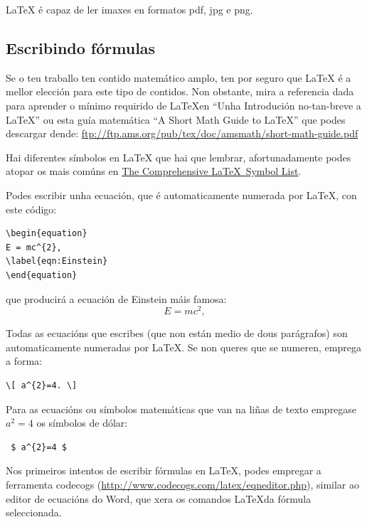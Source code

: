 \LaTeX{} é capaz de ler imaxes en formatos pdf, jpg e png.

\subsection{Escribindo fórmulas}

Se o teu traballo ten contido matemático amplo, ten por seguro que \LaTeX{} é a mellor elección para este tipo de contidos. Non obstante, mira a referencia dada para aprender o mínimo requirido de \LaTeX en \enquote{Unha Introdución no-tan-breve a \LaTeX} ou esta guía matemática \enquote{A Short Math Guide to \LaTeX} que podes descargar dende: \url{ftp://ftp.ams.org/pub/tex/doc/amsmath/short-math-guide.pdf}


Hai diferentes símbolos en \LaTeX{} que hai que lembrar, afortunadamente podes atopar os mais comúns en \href{http://ctan.org/pkg/comprehensive}{The Comprehensive \LaTeX~Symbol List}.

Podes escribir unha ecuación, que é automaticamente numerada por \LaTeX{}, con este código:
\begin{verbatim}
\begin{equation}
E = mc^{2},
\label{eqn:Einstein}
\end{equation}
\end{verbatim}

que producirá a ecuación de Einstein máis famosa:
\begin{equation}
E = mc^{2},
\label{eqn:Einstein}
\end{equation}

Todas as ecuacións que escribes (que non están medio de dous parágrafos) son automaticamente numeradas por \LaTeX{}. Se non queres que se numeren, emprega a forma:
\begin{verbatim}
\[ a^{2}=4. \]
\end{verbatim}

Para as ecuacións ou símbolos matemáticas que van na liñas de texto empregase $a^{2}=4$ os símbolos de dólar: \begin{verbatim} $ a^{2}=4 $ \end{verbatim}



Nos primeiros intentos de escribir fórmulas en \LaTeX, podes empregar a ferramenta codecogs (\url{http://www.codecogs.com/latex/eqneditor.php}), similar ao editor de ecuacións do Word, que  xera os comandos \LaTeX da fórmula seleccionada.


